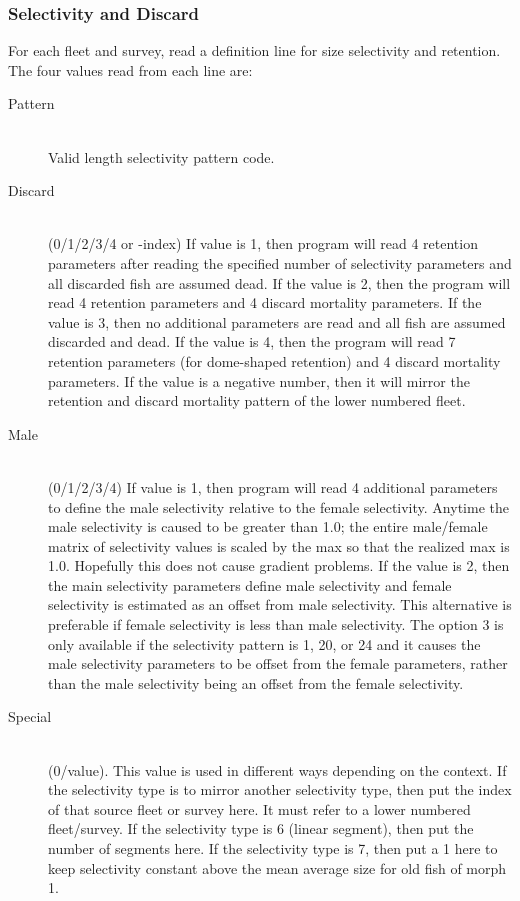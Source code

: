 \subsubsection{Selectivity and Discard}
For each fleet and survey, read a definition line for size selectivity and retention.  The four values read from each line are:

\begin{description}
	\item[Pattern]\hfill\\
	Valid length selectivity pattern code.

	\hypertarget{DomeRetention}{}
	\item[Discard]\hfill\\
	(0/1/2/3/4 or -index)  If value is 1, then program will read 4 retention parameters after reading the specified number of selectivity parameters and all discarded fish are assumed dead.  If the value is 2, then the program will read 4 retention parameters and 4 discard mortality parameters.  If the value is 3, then no additional parameters are read and all fish are assumed discarded and dead. If the value is 4, then the program will read 7 retention parameters (for dome-shaped retention) and 4 discard mortality parameters.  If the value is a negative number, then it will mirror the retention and discard mortality pattern of the lower numbered fleet.

	\item[Male]\hfill\\
	(0/1/2/3/4)  If value is 1, then program will read 4 additional parameters to define the male selectivity relative to the female selectivity.  Anytime the male selectivity is caused to be greater than 1.0; the entire male/female matrix of selectivity values is scaled by the max so that the realized max is 1.0.  Hopefully this does not cause gradient problems.  If the value is 2, then the main selectivity parameters define male selectivity and female selectivity is estimated as an offset from male selectivity.  This alternative is preferable if female selectivity is less than male selectivity.  The option 3 is only available if the selectivity pattern is 1, 20, or 24 and it causes the male selectivity parameters to be offset from the female parameters, rather than the male selectivity being an offset from the female selectivity.

	\item[Special]\hfill\\
	(0/value).  This value is used in different ways depending on the context.  If the selectivity type is to mirror another selectivity type, then put the index of that source fleet or survey here.  It must refer to a lower numbered fleet/survey.  If the selectivity type is 6 (linear segment), then put the number of segments here.  If the selectivity type is 7, then put a 1 here to keep selectivity constant above the mean average size for old fish of morph 1.
\end{description}

